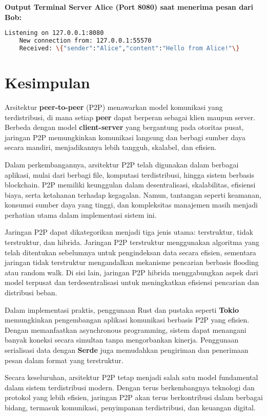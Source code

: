 \textbf{Output Terminal Server Alice (Port 8080) saat menerima pesan dari Bob:}
\begin{lstlisting}[language=bash]
	Listening on 127.0.0.1:8080
	New connection from: 127.0.0.1:55570
	Received: \{"sender":"Alice","content":"Hello from Alice!"\}
\end{lstlisting}


\section{Kesimpulan}

Arsitektur \textbf{peer-to-peer} (P2P) menawarkan model komunikasi yang terdistribusi, di mana setiap \textbf{peer} dapat berperan sebagai klien maupun server. Berbeda dengan model \textbf{client-server} yang bergantung pada otoritas pusat, jaringan P2P memungkinkan komunikasi langsung dan berbagi sumber daya secara mandiri, menjadikannya lebih tangguh, skalabel, dan efisien.

Dalam perkembangannya, arsitektur P2P telah digunakan dalam berbagai aplikasi, mulai dari berbagi file, komputasi terdistribusi, hingga sistem berbasis blockchain. P2P memiliki keunggulan dalam desentralisasi, skalabilitas, efisiensi biaya, serta ketahanan terhadap kegagalan. Namun, tantangan seperti keamanan, konsumsi sumber daya yang tinggi, dan kompleksitas manajemen masih menjadi perhatian utama dalam implementasi sistem ini.

Jaringan P2P dapat dikategorikan menjadi tiga jenis utama: terstruktur, tidak terstruktur, dan hibrida. Jaringan P2P terstruktur menggunakan algoritma yang telah ditentukan sebelumnya untuk pengindeksan data secara efisien, sementara jaringan tidak terstruktur mengandalkan mekanisme pencarian berbasis flooding atau random walk. Di sisi lain, jaringan P2P hibrida menggabungkan aspek dari model terpusat dan terdesentralisasi untuk meningkatkan efisiensi pencarian dan distribusi beban.

Dalam implementasi praktis, penggunaan Rust dan pustaka seperti \textbf{Tokio} memungkinkan pengembangan aplikasi komunikasi berbasis P2P yang efisien. Dengan memanfaatkan asynchronous programming, sistem dapat menangani banyak koneksi secara simultan tanpa mengorbankan kinerja. Penggunaan serialisasi data dengan \textbf{Serde} juga memudahkan pengiriman dan penerimaan pesan dalam format yang terstruktur.

Secara keseluruhan, arsitektur P2P tetap menjadi salah satu model fundamental dalam sistem terdistribusi modern. Dengan terus berkembangnya teknologi dan protokol yang lebih efisien, jaringan P2P akan terus berkontribusi dalam berbagai bidang, termasuk komunikasi, penyimpanan terdistribusi, dan keuangan digital.


